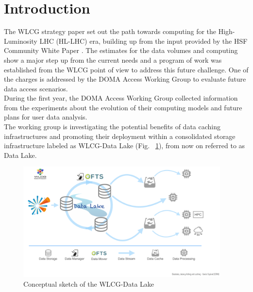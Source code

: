 \section{Introduction}
The WLCG strategy paper \cite{wlcgstrategy} set out the path towards computing for the High-Luminosity LHC (HL-LHC) era, building up from the input provided by the HSF \cite{hsf} Community White Paper \cite{cwp}.
The estimates for the data volumes and computing show a major step up from the current needs and a program of work was established from the WLCG point of view to address this future challenge. One of the charges is addressed by the DOMA Access Working Group to evaluate future data access scenarios.\\
During the first year, the DOMA Access Working Group collected information from the experiments about the evolution of their computing models and future plans for user data analysis.\\
The working group is investigating the potential benefits of data caching infrastructures and promoting their deployment within a consolidated storage infrastructure labeled as WLCG-Data Lake (Fig. ~\ref{datalake-concept}), from now on referred to as Data Lake.

\begin{figure}
  \centering
  \includegraphics[height=6cm]{datalake-concept-sketch.png}
  \caption{{\em} Conceptual sketch of the WLCG-Data Lake }
  \label{datalake-concept}
\end{figure}



